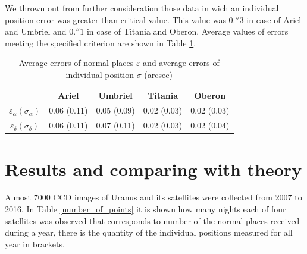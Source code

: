 \documentclass[]{article}
\begin{document}
We thrown out from further consideration those data in wich an individual position error was greater than critical value. This value was $0.''3$ in case of Ariel and Umbriel and $0.''1$ in case of Titania and Oberon. Average values of errors meeting the specified criterion are shown in Table \ref{errors}.\par
\begin{table}[h!]
\caption{Average errors of normal places $\varepsilon$ and average errors of individual position $\sigma$ (arcsec)}
\label{errors}
\begin{center}
\begin{tabular}{|c|c|c|c|c|}
\hline
&Ariel&Umbriel&Titania&Oberon \\
\hline
$\varepsilon_\alpha (\sigma_\alpha)$&0.06 (0.11)&0.05 (0.09)&0.02 (0.03)&0.02 (0.03) \\
$\varepsilon_\delta (\sigma_\delta)$&0.06 (0.11)&0.07 (0.11)&0.02 (0.03)&0.02 (0.04) \\
\hline
\end{tabular}
\end{center}
\end{table}



\section{Results and comparing with theory}
Almost 7000 CCD images of Uranus and its satellites were collected from 2007 to 2016. In Table \ref{number_of_points} it is shown how many nights each of four satellites was observed that corresponds to number of the normal places received during a year, there is the quantity of the individual positions measured for all year in brackets.\par
\end{document}
